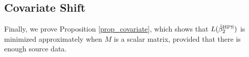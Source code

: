 \subsection{Covariate Shift}\label{app_proof_33}
 
Finally, we prove Proposition \ref{prop_covariate}, which shows that $L(\hat{\beta}_2^{\textup{HPS}})$ is minimized approximately when $M$ is a scalar matrix, provided that there is enough source data.


